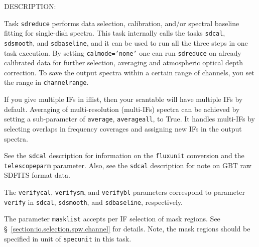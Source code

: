 DESCRIPTION:

Task {\tt sdreduce} performs data selection, calibration, and/or spectral
baseline fitting for single-dish spectra. This task internally calls the
tasks {\tt sdcal}, {\tt sdsmooth}, and {\tt sdbaseline}, and it can be used to run all the
three steps in one task execution.
By setting {\tt calmode='none'}
one can run {\tt sdreduce} on already calibrated data for further selection, averaging and atmospheric optical depth correction. 
To save the output spectra within a certain range of 
channels, you set the range in {\tt channelrange}. 

If you give multiple IFs in iflist, then your scantable will have
multiple IFs by default. Averaging of multi-resolution (multi-IFs)
spectra can be achieved by setting a sub-parameter of {\tt average}, 
{\tt averageall}, to True. It handles multi-IFs by selecting overlaps in 
frequency coverages and assigning new IFs in the output spectra.

See the {\tt sdcal} description for information on the {\tt fluxunit} 
conversion and the {\tt telescopeparm} parameter.
Also, see the {\tt sdcal} description for note on GBT raw SDFITS format data.

The {\tt verifycal}, {\tt verifysm}, and {\tt verifybl}  parameters correspond to parameter
{\tt  verify} in {\tt sdcal}, {\tt sdsmooth}, and {\tt sdbaseline}, respectively. 
    

The parameter {\tt masklist} accepts per IF selection of mask regions. 
See \S~\ref{section:io.selection.spw.channel} for details. 
Note, the mask regions should be specified in unit of {\tt specunit} 
in this task.


